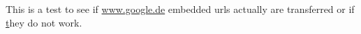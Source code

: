 This is a test to see if \url{www.google.de} embedded urls actually are transferred or if \href{http://google.nl} they
do not work.